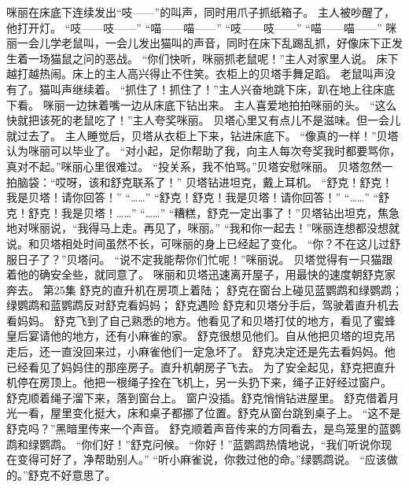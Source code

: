 \documentclass[a4paper,12pt,UTF8,twoside]{ctexbook}
\begin{document}
        咪丽在床底下连续发出“吱——”的叫声，同时用爪子抓纸箱子。 
        主人被吵醒了，他打开灯。 
        “吱——吱——” 
        “喵——喵——” 
        “吱——吱——” 
        “喵——喵——” 
        咪丽一会儿学老鼠叫，一会儿发出猫叫的声音，同时在床下乱踢乱抓，好像床下正发生着一场猫鼠之问的恶战。 
        “你们快听，咪丽抓老鼠呢！”主人对家里人说。 
        床下越打越热闹。床上的主人高兴得止不住笑。衣柜上的贝塔手舞足蹈。 
        老鼠叫声没有了。猫叫声继续着。 
        “抓住了！抓住了！”主人兴奋地跳下床，趴在地上往床底下看。 
        咪丽一边抹着嘴一边从床底下钻出来。 
        主人喜爱地拍拍咪丽的头。 
        “这么快就把该死的老鼠吃了！”主人夸奖咪丽。 
        贝塔心里又有点儿不是滋味。但一会儿就过去了。 
        主人睡觉后，贝塔从衣柜上下来，钻进床底下。 
        “像真的一样！”贝塔认为咪丽可以毕业了。 
        “对小起，足你帮助了我，向主人每次夸奖我时都要骂你，真对不起。”咪丽心里很难过。 
        “投关系，我不怕骂。”贝塔安慰咪丽。 
        贝塔忽然一拍脑袋：“哎呀，该和舒克联系了！” 
        贝塔钻进坦克，戴上耳机。 
        “舒克！舒克！我是贝塔！请你回答！” 
        “……” 
        “舒克！舒克！我是贝塔！请你回答！” 
        “……” 
        “舒克！舒克！我是贝塔！……” 
        “……” 
        “糟糕，舒克一定出事了！”贝塔钻出坦克，焦急地对咪丽说，“我得马上走。再见了，咪丽。” 
        “我和你一起去！”咪丽连想都没想就说。和贝塔相处时间虽然不长，可咪丽的身上已经起了变化。 
        “你？不在这儿过舒服日子了？”贝塔问。 
        “说不定我能帮你们忙呢！”咪丽说。 
        贝塔觉得有一只猫跟着他的确安全些，就同意了。 
        咪丽和贝塔迅速离开屋子，用最快的速度朝舒克家奔去。   第25集 
        舒克的直升机在房项上着陆； 
        舒克在窗台上碰见蓝鹦鹉和绿鹦鹉； 
        绿鹦鹉和蓝鹦鹉反对舒克看妈妈； 
        舒克遇险   
        舒克和贝塔分手后，驾驶着直升机去看妈妈。 
        舒克飞到了自己熟悉的地方。他看见了和贝塔打仗的地方，看见了蜜蜂皇后宴请他的地方，还有小麻雀的家。 
        舒克很想见他们。自从他把贝塔的坦克吊走后，还一直没回来过，小麻雀他们一定急坏了。 
        舒克决定还是先去看妈妈。他已经看见了妈妈住的那座房子。直升机朝房子飞去。 
        为了安全起见，舒克把直升机停在房顶上。他把一根绳子拴在飞机上，另一头扔下来，绳子正好经过窗户。 
        舒克顺着绳子溜下来，落到窗台上。 
        窗户没插。舒克悄悄钻进屋里。 
        舒克借着月光一看，屋里变化挺大，床和桌子都挪了位置。舒克从窗台跳到桌子上。 
        “这不是舒克吗？”黑暗里传来一个声音。 
        舒克顺着声音传来的方同看去，是鸟笼里的蓝鹦鹉和绿鹦鹉。 
        “你们好！”舒克问候。 
        “你好！”蓝鹦鹉热情地说，“我们听说你现在变得可好了，净帮助别人。” 
        “听小麻雀说，你救过他的命。”绿鹦鹉说。 
        “应该做的。”舒克不好意思了。 
\end{document}
